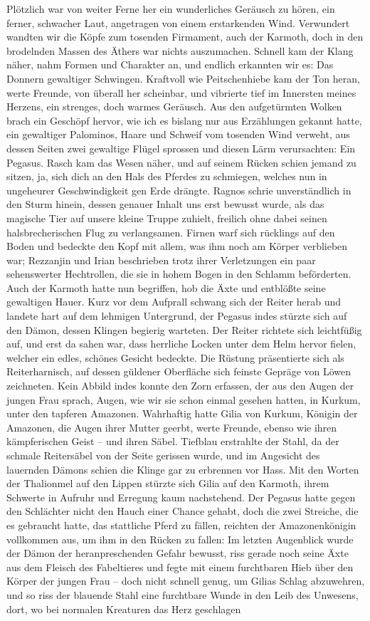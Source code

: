 Plötzlich war von weiter Ferne her ein wunderliches Geräusch zu hören, ein ferner, schwacher Laut, angetragen von einem erstarkenden Wind. Verwundert wandten wir die Köpfe zum tosenden Firmament, auch der Karmoth, doch in den brodelnden Massen des Äthers war nichts auszumachen. Schnell kam der Klang näher, nahm Formen und Charakter an, und endlich erkannten wir es: Das Donnern gewaltiger Schwingen. Kraftvoll wie Peitschenhiebe kam der Ton heran, werte Freunde, von überall her scheinbar, und vibrierte tief im Innersten meines Herzens, ein strenges, doch warmes Geräusch. Aus den aufgetürmten Wolken brach ein Geschöpf hervor, wie ich es bislang nur aus Erzählungen gekannt hatte, ein gewaltiger Palominos, Haare und Schweif vom tosenden Wind verweht, aus dessen Seiten zwei gewaltige Flügel sprossen und diesen Lärm verursachten: Ein Pegasus. Rasch kam das Wesen näher, und auf seinem Rücken schien jemand zu sitzen, ja, sich dich an den Hals des Pferdes zu schmiegen, welches nun in ungeheurer Geschwindigkeit gen Erde drängte. Ragnos schrie unverständlich in den Sturm hinein, dessen genauer Inhalt uns erst bewusst wurde, als das magische Tier auf unsere kleine Truppe zuhielt, freilich ohne dabei seinen halsbrecherischen Flug zu verlangsamen. Firnen warf sich rücklings auf den Boden und bedeckte den Kopf mit allem, was ihm noch am Körper verblieben war; Rezzanjin und Irian beschrieben trotz ihrer Verletzungen ein paar sehenswerter Hechtrollen, die sie in hohem Bogen in den Schlamm beförderten. Auch der Karmoth hatte nun begriffen, hob die Äxte und entblößte seine gewaltigen Hauer. Kurz vor dem Aufprall schwang sich der Reiter herab und landete hart auf dem lehmigen Untergrund, der Pegasus indes stürzte sich auf den Dämon, dessen Klingen begierig warteten. Der Reiter richtete sich leichtfüßig auf, und erst da sahen war, dass herrliche Locken unter dem Helm hervor fielen, welcher ein edles, schönes Gesicht bedeckte. Die Rüstung präsentierte sich als Reiterharnisch, auf dessen güldener Oberfläche sich feinste Gepräge von Löwen zeichneten. Kein Abbild indes konnte den Zorn erfassen, der aus den Augen der jungen Frau sprach, Augen, wie wir sie schon einmal gesehen hatten, in Kurkum, unter den tapferen Amazonen. Wahrhaftig hatte Gilia von Kurkum, Königin der Amazonen, die Augen ihrer Mutter geerbt, werte Freunde, ebenso wie ihren kämpferischen Geist -- und ihren Säbel. Tiefblau erstrahlte der Stahl, da der schmale Reitersäbel von der Seite gerissen wurde, und im Angesicht des lauernden Dämons schien die Klinge gar zu erbrennen vor Hass. Mit den Worten der Thalionmel auf den Lippen stürzte sich Gilia auf den Karmoth, ihrem Schwerte in Aufruhr und Erregung kaum nachstehend. Der Pegasus hatte gegen den Schlächter nicht den Hauch einer Chance gehabt, doch die zwei Streiche, die es gebraucht hatte, das stattliche Pferd zu fällen, reichten der Amazonenkönigin vollkommen aus, um ihm in den Rücken zu fallen: Im letzten Augenblick wurde der Dämon der heranpreschenden Gefahr bewusst, riss gerade noch seine Äxte aus dem Fleisch des Fabeltieres und fegte mit einem furchtbaren Hieb über den Körper der jungen Frau -- doch nicht schnell genug, um Gilias Schlag abzuwehren, und so riss der blauende Stahl eine furchtbare Wunde in den Leib des Unwesens, dort, wo bei normalen Kreaturen das Herz geschlagen 